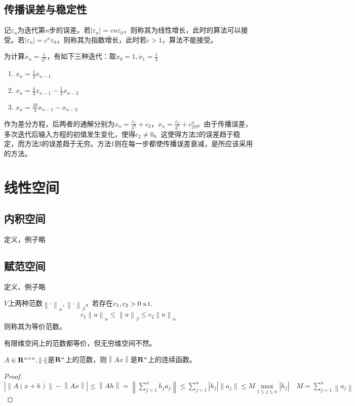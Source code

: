 \documentclass{ctexart}
\begin{document}
\subsection{传播误差与稳定性}
记$\varepsilon_n$为迭代第$n$步的误差。若$|\varepsilon_n|=cn\varepsilon_0$，则称其为线性增长，此时的算法可以接受。若$|\varepsilon_n|=c^n\varepsilon_0$，则称其为指数增长，此时若$c>1$，算法不能接受。
\begin{Eg}为计算$x_n=\frac{1}{3^n}$，有如下三种迭代：取$x_0=1,x_1=\frac{1}{3}$
\begin{enumerate}
\item $x_n=\frac{1}{3}x_{n-1}$
\item $x_n=\frac{4}{3}x_{n-1}-\frac{1}{3}x_{n-2}$
\item $x_n=\frac{10}{3}x_{n-1}-x_{n-2}$
\end{enumerate}

作为差分方程，后两者的通解分别为$x_n=\frac{c_1}{3^n}+c_2$，$x_n=\frac{c_1}{3^n}+c_23^n$。由于传播误差，多次迭代后输入方程的初值发生变化，使得$c_2\neq 0$。这使得方法2的误差趋于稳定，而方法3的误差趋于无穷。方法1则在每一步都使传播误差衰减，是所应该采用的方法。
\end{Eg}

\section{线性空间}
\subsection{内积空间}
定义，例子略
\newcommand{\nm}[1]{\left\|#1\right\|}

\subsection{赋范空间}
定义、例子略
\begin{Def}
$V$上两种范数$\nm{\cdot}_\alpha,\nm{\cdot}_\beta$，若存在$c_1,c_2>0\text{ s.t. }$
\[c_1\nm{u}_\alpha\leq \nm{u}_\beta\leq c_2\nm{u}_\alpha\]
则称其为等价范数。
\end{Def}

有限维空间上的范数都等价，但无穷维空间不然。
\begin{Lemma}
$A\in\R^{n\times n},\nm{\cdot}$是$\mathbf{R}^n$上的范数，则$\nm{Ax}$是$\mathbf{R}^n$上的连续函数。
\end{Lemma}
\begin{proof}
$|\nm{A(x+h)}-\nm{Ax}|\leq \nm{Ah}=\nm{\sum_{j=1}^nh_ja_j}\leq \sum\limits_{j=1}^n|h_j|\|a_j\|\leq M\max\limits_{1\leq j\leq n}|h_j|\quad M=\sum\limits_{j=1}^n\nm{a_j}$
\end{proof}
\end{document}

